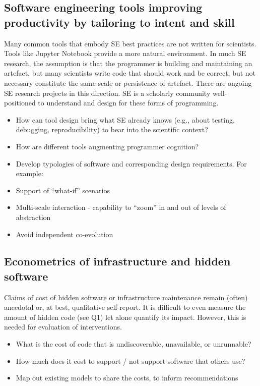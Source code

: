 \documentclass[a4paper,UKenglish]{dagman}
\begin{document}
\subsection{Software engineering tools improving productivity by tailoring to intent and skill}

Many common tools that embody SE best practices are not written for scientists. Tools like Jupyter Notebook provide a more natural environment. In much SE research, the assumption is that the programmer is building and maintaining an artefact, but many scientists write code that should work and be correct, but not necessary constitute the same scale or persistence of artefact. There are ongoing SE research projects in this direction. SE is a scholarly community well-positioned to understand and design for these forms of programming.

\begin{itemize}
\item How can tool design bring what SE already knows (e.g., about testing, debugging, reproducibility) to bear into the scientific context?
\item How are different tools augmenting programmer cognition?
\item Develop typologies of software and corresponding design requirements. For example:
\item Support of ``what-if'' scenarios
\item Multi-scale interaction - capability to ``zoom'' in and out of levels of abstraction
\item Avoid independent co-evolution
\end{itemize}

\subsection{Econometrics of infrastructure and hidden software}

Claims of cost of hidden software or infrastructure maintenance remain (often) anecdotal or, at best, qualitative self-report. It is difficult to even measure the amount of hidden code (see Q1) let alone quantify its impact. However, this is needed for evaluation of interventions.


\begin{itemize}
\item What is the cost of code that is undiscoverable, unavailable, or unrunnable?
\item How much does it cost to support / not support software that others use? 
\item Map out existing models to share the costs, to inform recommendations
\end{itemize}
\end{document}

